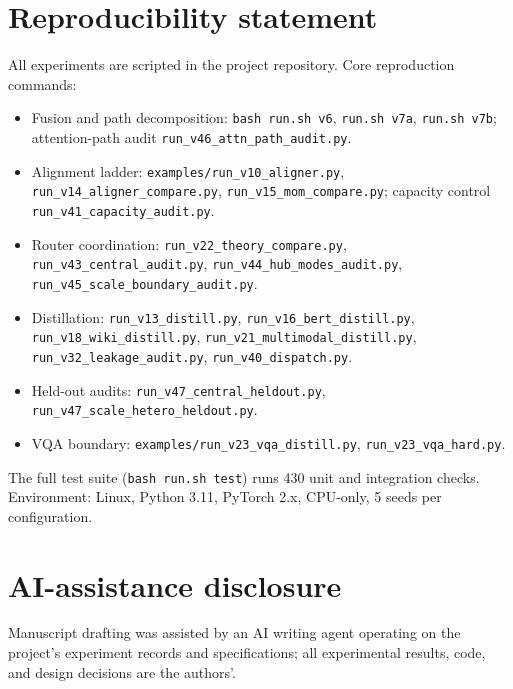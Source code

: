 \documentclass[10pt,twoside]{article}
\theoremstyle{definition}
\theoremstyle{plain}
\theoremstyle{remark}
\begin{document}
\section*{Reproducibility statement}
\label{sec:repro}

All experiments are scripted in the project repository. Core reproduction commands:

\begin{itemize}[leftmargin=1.6em, itemsep=0.5pt, parsep=0pt]
    \item Fusion and path decomposition: \texttt{bash run.sh v6}, \texttt{run.sh v7a}, \texttt{run.sh v7b}; attention-path audit \texttt{run\_v46\_attn\_path\_audit.py}.
    \item Alignment ladder: \texttt{examples/run\_v10\_aligner.py}, \texttt{run\_v14\_aligner\_compare.py}, \texttt{run\_v15\_mom\_compare.py}; capacity control \texttt{run\_v41\_capacity\_audit.py}.
    \item Router coordination: \texttt{run\_v22\_theory\_compare.py}, \texttt{run\_v43\_central\_audit.py}, \texttt{run\_v44\_hub\_modes\_audit.py}, \texttt{run\_v45\_scale\_boundary\_audit.py}.
    \item Distillation: \texttt{run\_v13\_distill.py}, \texttt{run\_v16\_bert\_distill.py}, \texttt{run\_v18\_wiki\_distill.py}, \texttt{run\_v21\_multimodal\_distill.py}, \texttt{run\_v32\_leakage\_audit.py}, \texttt{run\_v40\_dispatch.py}.
    \item Held-out audits: \texttt{run\_v47\_central\_heldout.py}, \texttt{run\_v47\_scale\_hetero\_heldout.py}.
    \item VQA boundary: \texttt{examples/run\_v23\_vqa\_distill.py}, \texttt{run\_v23\_vqa\_hard.py}.
\end{itemize}

The full test suite (\texttt{bash run.sh test}) runs 430 unit and integration checks. Environment: Linux, Python 3.11, PyTorch 2.x, CPU-only, 5 seeds per configuration.

\section*{AI-assistance disclosure}

Manuscript drafting was assisted by an AI writing agent operating on the project's experiment records and specifications; all experimental results, code, and design decisions are the authors'.



\end{document}
